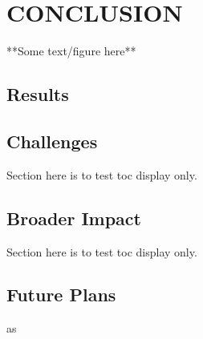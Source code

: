 %
%
%
%



\chapter{CONCLUSION \label{cha:Conclusion}}

**Some text/figure here**

\section{Results}

\section{Challenges}
Section here is to test toc display only.

\section{Broader Impact}
Section here is to test toc display only.

\section{Future Plans}
as